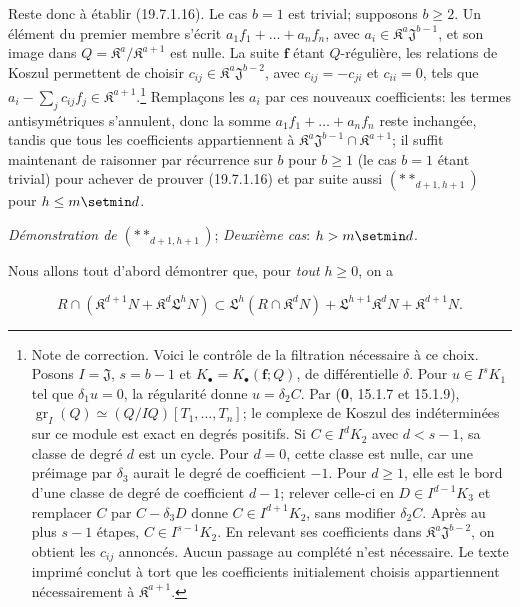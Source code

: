 Reste donc à établir (19.7.1.16). Le cas $b=1$ est trivial; supposons $b\geq2$. Un élément du premier membre s'écrit $a_1f_1+\ldots+a_nf_n$, avec $a_i\in\mathfrak K^a\mathfrak J^{b-1}$, et son image dans $Q=\mathfrak K^a/\mathfrak K^{a+1}$ est nulle. La suite $\mathbf f$ étant $Q$-régulière, les relations de Koszul permettent de choisir $c_{ij}\in\mathfrak K^a\mathfrak J^{b-2}$, avec $c_{ij}=-c_{ji}$ et $c_{ii}=0$, tels que $a_i-\sum_j c_{ij}f_j\in\mathfrak K^{a+1}$.\footnote{Note de correction. Voici le contrôle de la filtration nécessaire à ce choix. Posons $I=\mathfrak J$, $s=b-1$ et $K_\bullet=K_\bullet(\mathbf f;Q)$, de différentielle $\delta$. Pour $u\in I^sK_1$ tel que $\delta_1u=0$, la régularité donne $u=\delta_2C$. Par (\textbf{0}, 15.1.7 et 15.1.9), $\operatorname{gr}_I(Q)\simeq(Q/IQ)[T_1,\ldots,T_n]$; le complexe de Koszul des indéterminées sur ce module est exact en degrés positifs. Si $C\in I^dK_2$ avec $d<s-1$, sa classe de degré $d$ est un cycle. Pour $d=0$, cette classe est nulle, car une préimage par $\delta_3$ aurait le degré de coefficient $-1$. Pour $d\geq1$, elle est le bord d'une classe de degré de coefficient $d-1$; relever celle-ci en $D\in I^{d-1}K_3$ et remplacer $C$ par $C-\delta_3D$ donne $C\in I^{d+1}K_2$, sans modifier $\delta_2C$. Après au plus $s-1$ étapes, $C\in I^{s-1}K_2$. En relevant ses coefficients dans $\mathfrak K^a\mathfrak J^{b-2}$, on obtient les $c_{ij}$ annoncés. Aucun passage au complété n'est nécessaire. Le texte imprimé conclut à tort que les coefficients initialement choisis appartiennent nécessairement à $\mathfrak K^{a+1}$.} Remplaçons les $a_i$ par ces nouveaux coefficients: les termes antisymétriques s'annulent, donc la somme $a_1f_1+\ldots+a_nf_n$ reste inchangée, tandis que tous les coefficients appartiennent à $\mathfrak K^a\mathfrak J^{b-1}\cap\mathfrak K^{a+1}$; il suffit maintenant de raisonner par
récurrence sur $b$ pour $b\geq1$ (le cas $b=1$ étant trivial) pour achever de prouver (19.7.1.16) et par suite aussi $(**_{d+1,h+1})$ pour $h\leq m\setmin d$.

\begin{env}[19.7.1.18]
\label{IV.19.7.1.18}
\emph{Démonstration de} $(**_{d+1,h+1})$; \emph{Deuxième cas}: $h>m\setmin d$.
\end{env}

Nous allons tout d'abord démontrer que, pour \emph{tout} $h\geq0$, on a
\begin{env}[19.7.1.19]
\label{IV.19.7.1.19}
\[
  R\cap(\mathfrak K^{d+1}N+\mathfrak K^d\mathfrak L^hN)\subset\mathfrak L^h(R\cap\mathfrak K^dN)+\mathfrak L^{h+1}\mathfrak K^dN+\mathfrak K^{d+1}N.
\]
\end{env}

